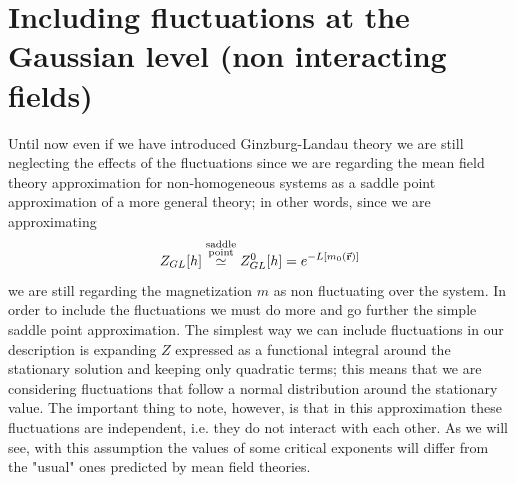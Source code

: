 \documentclass[../../Main/Main.tex]{subfiles}
\begin{document}
\section{Including fluctuations at the Gaussian level (non interacting fields)}
Until now even if we have introduced Ginzburg-Landau theory we are still neglecting the effects of the fluctuations since we are regarding the mean field theory approximation for non-homogeneous systems as a saddle point approximation of a more general theory; in other words, since we are approximating
\begin{equation*}
  Z_{GL} [h] \overset{\substack{ \text{saddle} \\  \text{point} } }{\simeq } Z_{GL}^0 [h] = e^{- L [m_0 (\va{r})]}
\end{equation*}
we are still regarding the magnetization \( m \) as non fluctuating over the system. In order to include the fluctuations we must do more and go further the simple saddle point approximation. The simplest way we can include fluctuations in our description is expanding \( Z \) expressed as a functional integral around the stationary solution and keeping only quadratic terms; this means that we are considering fluctuations that follow a normal distribution around the stationary value. The important thing to note, however, is that in this approximation these fluctuations are independent, i.e. they do not interact with each other. As we will see, with this assumption the values of some critical exponents will differ from the "usual" ones predicted by mean field theories.
\end{document}
